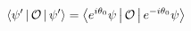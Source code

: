 \documentclass[preview]{standalone}
\begin{document}
\begin{align*}
\Braket{\psi '|\mathcal{O}|\psi '} = \Braket{e^{i \theta_0}\psi |\mathcal{O}|e^{-i \theta_0}\psi }
\end{align*}
\end{document}
